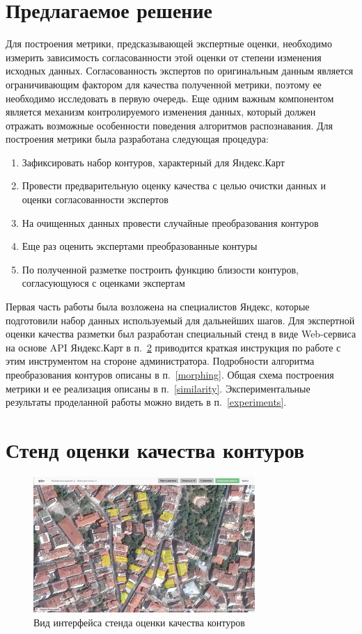 \documentclass[12pt]{article}
\begin{document}
\section{Предлагаемое решение}
Для построения метрики, предсказывающей экспертные оценки, необходимо измерить зависимость согласованности этой оценки от степени изменения исходных данных. Согласованность экспертов по оригинальным данным является ограничивающим фактором для качества полученной метрики, поэтому ее необходимо исследовать в первую очередь. Еще одним важным компонентом является механизм контролируемого изменения данных, который должен отражать возможные особенности поведения алгоритмов распознавания. Для построения метрики была разработана следующая процедура:
\begin{enumerate}
	\item Зафиксировать набор контуров, характерный для Яндекс.Карт
	\item Провести предварительную оценку качества с целью очистки данных и оценки согласованности экспертов
	\item На очищенных данных провести случайные преобразования контуров
	\item Еще раз оценить экспертами преобразованные контуры
	\item По полученной разметке построить функцию близости контуров, согласующуюся с оценками экспертам
\end{enumerate}
Первая часть работы была возложена на специалистов Яндекс, которые подготовили набор данных используемый для дальнейших шагов. Для экспертной оценки качества разметки был разработан специальный стенд в виде Web-сервиса на основе API Яндекс.Карт в п.~\ref{tool} приводится краткая инструкция по работе с этим инструментом на стороне администратора. Подробности алгоритма преобразования контуров описаны в п.~\ref{morphing}. Общая схема построения метрики и ее реализация описаны в п.~\ref{similarity}. Экспериментальные результаты проделанной работы можно видеть в п.~\ref{experiments}.

\section{Стенд оценки качества контуров}
\label{tool}

\begin{figure}
\label{tool-screen}
\caption{Вид интерфейса стенда оценки качества контуров}
\begin{center}
\includegraphics[width=0.75\textwidth]{images/tool-screen-1.png}
\end{center}
\end{figure}
\end{document}
